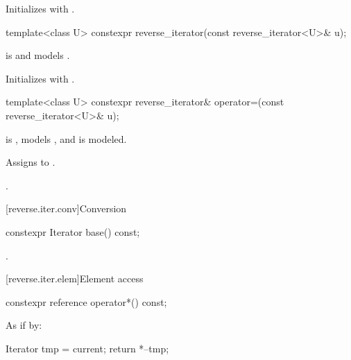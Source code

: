 \begin{itemdescr}
\pnum
\effects
Initializes
with .
\end{itemdescr}

%
\begin{itemdecl}
template<class U> constexpr reverse_iterator(const reverse_iterator<U>& u);
\end{itemdecl}

\begin{itemdescr}
\pnum
\constraints
{} is  and
 models .

\pnum
\effects
Initializes
with
.
\end{itemdescr}

%
\begin{itemdecl}
template<class U>
  constexpr reverse_iterator&
    operator=(const reverse_iterator<U>& u);
\end{itemdecl}

\begin{itemdescr}
\pnum
\constraints
{} is ,
 models , and
 is modeled.

\pnum
\effects
Assigns  to .

\pnum
\returns
{}.
\end{itemdescr}

[reverse.iter.conv]{Conversion}

%
\begin{itemdecl}
constexpr Iterator base() const;
\end{itemdecl}

\begin{itemdescr}
\pnum
\returns
{}.
\end{itemdescr}

[reverse.iter.elem]{Element access}

%
\begin{itemdecl}
constexpr reference operator*() const;
\end{itemdecl}

\begin{itemdescr}
\pnum
\effects
As if by:
\begin{codeblock}
Iterator tmp = current;
return *--tmp;
\end{codeblock}

\end{itemdescr}

